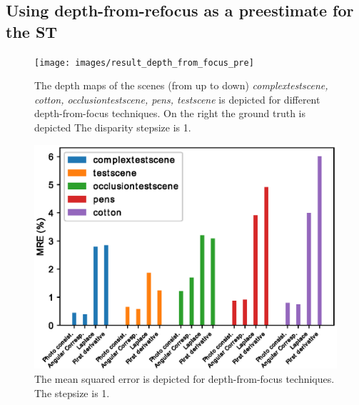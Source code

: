 \documentclass  [
  paper    = a4,
  BCOR     = 10mm,
  twoside,
  fontsize = 12pt,
  fleqn,
  toc      = bibnumbered,
  toc      = listofnumbered,
  numbers  = noendperiod,
  headings = normal,
  listof   = leveldown,
  version  = 3.03
]                                       {scrreprt}
\begin{document}
	\subsection{Using depth-from-refocus as a preestimate for the ST}
		\begin{figure}
		\centering
		\texttt{[image: images/result\_depth\_from\_focus\_pre]}
		\caption[Depth from focus: depthmaps with Resolution 1]{The depth maps of the scenes (from up to down) \textit{complextestscene, cotton, occlusiontestscene, pens, testscene} is depicted for different depth-from-focus techniques. On the right the ground truth is depicted The disparity stepsize is 1.}
		\label{fig:resultdepthfromfocuspre}
	\end{figure}
	\begin{figure}
	\centering
	\includegraphics[width=0.7\linewidth]{images/error_res1_all}
	\caption[Mean squared error for depth-from-focus techniques]{The mean squared error is depicted for depth-from-focus techniques. The stepsize is 1.}
	\label{fig:errorres1all}
	\end{figure}
\end{document}
